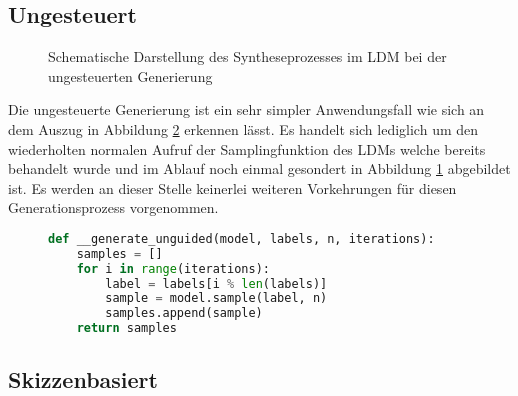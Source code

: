 \subsection {Ungesteuert}

\begin{figure}[htbp]
    \centering
    \caption{Schematische Darstellung des Syntheseprozesses im \ac{LDM} bei der ungesteuerten Generierung}
    \label{fig:unguided}
\end{figure}
Die ungesteuerte Generierung ist ein sehr simpler Anwendungsfall wie sich an dem Auszug in Abbildung \ref{fig:gen_unguided} erkennen lässt. Es handelt sich lediglich um den wiederholten normalen Aufruf der Samplingfunktion des \ac{LDM}s welche bereits behandelt wurde und im Ablauf noch einmal gesondert in Abbildung \ref{fig:unguided} abgebildet ist. Es werden an dieser Stelle keinerlei weiteren Vorkehrungen für diesen Generationsprozess vorgenommen.   
\begin{figure}[htbp]
\begin{lstlisting}[language=python]
def __generate_unguided(model, labels, n, iterations):
    samples = []
    for i in range(iterations):
        label = labels[i % len(labels)]
        sample = model.sample(label, n)
        samples.append(sample)
    return samples
\end{lstlisting}
    \captionsetup{type=figure}
    \label{fig:gen_unguided}
\end{figure}

\subsection {Skizzenbasiert}

